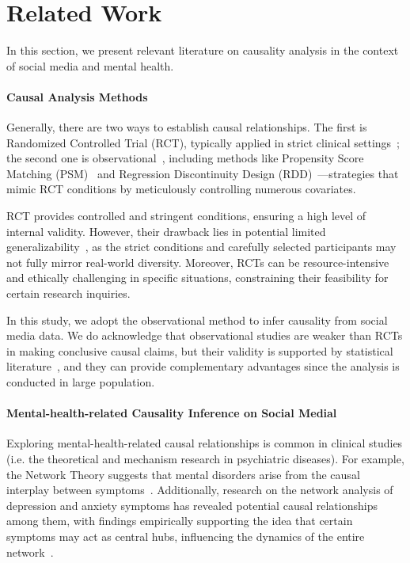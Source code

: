 \section{Related Work}
In this section, we present relevant literature on causality analysis in the context of social media and mental health.
\paragraph{Causal Analysis Methods} 
Generally, there are two ways to establish causal relationships. The first is Randomized Controlled Trial (RCT), typically applied in strict clinical settings~\cite{cipriani2018comparative}; the second one is observational~\cite{PMID:32164822}, including methods like Propensity Score Matching (PSM)~\cite{Rosenbaum1983TheCR} and Regression Discontinuity Design (RDD)~\cite{Cattaneo2019API}—strategies that mimic RCT conditions by meticulously controlling numerous covariates.

RCT provides controlled and stringent conditions, ensuring a high level of internal validity. However, their drawback lies in potential limited generalizability~\cite{KennedyMartin2015ALR}, as the strict conditions and carefully selected participants may not fully mirror real-world diversity. Moreover, RCTs can be resource-intensive and ethically challenging in specific situations, constraining their feasibility for certain research inquiries. 

In this study, we adopt the observational method to infer causality from social media data. We do acknowledge that observational studies are weaker than RCTs in making conclusive causal claims, 
but their validity is supported by statistical literature~\cite{Caliendo2005SomePG}, and they can provide complementary advantages since the analysis is conducted in large population.

\paragraph{Mental-health-related Causality Inference on Social Medial}
Exploring mental-health-related causal relationships is common in clinical studies (i.e. the theoretical and mechanism research in psychiatric diseases). For example, the Network Theory suggests that mental disorders arise from the causal interplay between symptoms~\citep{borsboom2013network}. Additionally, research on the network analysis of depression and anxiety symptoms has revealed potential causal relationships among them, with findings empirically supporting the idea that certain symptoms may act as central hubs, influencing the dynamics of the entire network~\citep{beard2016network}.

